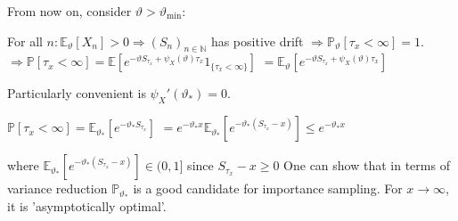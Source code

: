 From now on, consider \( \vartheta > \vartheta_{\min} \):

For all \( n: \mathbb{E}_\vartheta[X_n] > 0 \Rightarrow (S_n)_{n \in \mathbb{N}} \) has positive drift \( \Rightarrow \mathbb{P}_\vartheta[\tau_x < \infty] = 1 \).
\( \Rightarrow \mathbb{P}[\tau_x < \infty] = \mathbb{E} [e^{-\vartheta S_{\tau_x} + \psi_X(\vartheta) \tau_x} 1_{\{\tau_x < \infty\}}] \)
\( = \mathbb{E}_\vartheta [e^{-\vartheta S_{\tau_x} + \psi_X(\vartheta) \tau_x}]\)

Particularly convenient is \( \psi_X'(\vartheta_\ast) = 0 \).

\( \mathbb{P}[\tau_x < \infty] = \mathbb{E}_{\vartheta_\ast} \left[ e^{-\vartheta_\ast S_{\tau_x}} \right]\) 
\( = e^{-\vartheta_\ast x} \mathbb{E}_{\vartheta_\ast} \left[ e^{-\vartheta_\ast (S_{\tau_x} - x)} \right] \leq e^{-\vartheta_\ast x}\) 

where \( \mathbb{E}_{\vartheta_\ast} \left[ e^{-\vartheta_\ast (S_{\tau_x} - x)} \right] \in (0, 1]\) since \( S_{\tau_x} - x \geq 0 \)
One can show that in terms of variance reduction \( \mathbb{P}_{\vartheta_\ast} \) is a good candidate for importance sampling. 
For \( x \rightarrow \infty \), it is 'asymptotically optimal'.
